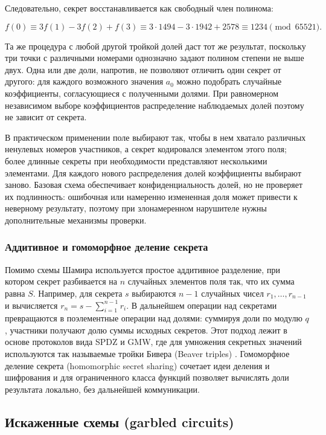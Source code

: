 Следовательно, секрет восстанавливается как свободный член полинома:

\begin{equation}
f(0) \equiv 3f(1)-3f(2)+f(3)
\equiv 3\cdot1494-3\cdot1942+2578
\equiv 1234 \pmod{65521}.
\end{equation}

Та же процедура с любой другой тройкой долей даст тот же результат, поскольку три точки с различными номерами однозначно задают полином степени не выше двух. Одна или две доли, напротив, не позволяют отличить один секрет от другого: для каждого возможного значения \(a_0\) можно подобрать случайные коэффициенты, согласующиеся с полученными долями. При равномерном независимом выборе коэффициентов распределение наблюдаемых долей поэтому не зависит от секрета.

В практическом применении поле выбирают так, чтобы в нем хватало различных ненулевых номеров участников, а секрет кодировался элементом этого поля; более длинные секреты при необходимости представляют несколькими элементами. Для каждого нового распределения долей коэффициенты выбирают заново. Базовая схема обеспечивает конфиденциальность долей, но не проверяет их подлинность: ошибочная или намеренно измененная доля может привести к неверному результату, поэтому при злонамеренном нарушителе нужны дополнительные механизмы проверки.

\subsubsection{Аддитивное и гомоморфное деление секрета}

Помимо схемы Шамира используется простое аддитивное разделение, при котором секрет разбивается на \(n\) случайных элементов поля так, что их сумма равна \(S\).  Например, для секрета \(s\) выбираются \(n-1\) случайных чисел \(r_1,\ldots,r_{n-1}\) и вычисляется \(r_n = s - \sum_{i=1}^{n-1} r_i\).  В дальнейшем операции над секретами превращаются в поэлементные операции над долями: суммируя доли по модулю \(q\), участники получают долю суммы исходных секретов.  Этот подход лежит в основе протоколов вида SPDZ и GMW, где для умножения секретных значений используются так называемые тройки Бивера (Beaver triples) \cite{06}.  Гомоморфное деление секрета (homomorphic secret sharing) сочетает идеи деления и шифрования и для ограниченного класса функций позволяет вычислять доли результата локально, без дальнейшей коммуникации.

\subsection{Искаженные схемы (garbled circuits)}
\label{subsec:garbled-circuits}

